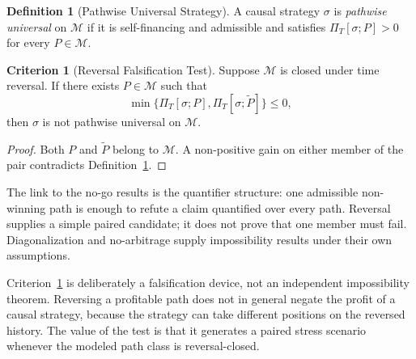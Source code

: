 \documentclass[aps,pra,reprint,superscriptaddress,amsmath,amssymb,floatfix]{revtex4-2}
\theoremstyle{plain}
\theoremstyle{definition}
\newtheorem{definition}{Definition}
\newtheorem{criterion}{Criterion}
\theoremstyle{remark}
\begin{document}
\begin{definition}[Pathwise Universal Strategy]
\label{def:universal}
  A causal strategy \(\sigma\) is \emph{pathwise universal} on
  \(\mathcal{M}\) if it is self-financing and admissible and satisfies
  \(\Pi_T[\sigma;P]>0\) for every \(P\in\mathcal{M}\).
\end{definition}

\begin{criterion}[Reversal Falsification Test]
  \label{crit:tr}
  Suppose \(\mathcal{M}\) is closed under time reversal. If there exists
  \(P\in\mathcal{M}\) such that
  \begin{equation}
    \min\{\Pi_T[\sigma;P],\Pi_T[\sigma;\widetilde P]\}\leq 0,
    \label{eq:reversaltest}
  \end{equation}
  then \(\sigma\) is not pathwise universal on \(\mathcal{M}\).
\end{criterion}

\begin{proof}
Both \(P\) and \(\widetilde P\) belong to \(\mathcal{M}\). A non-positive gain
on either member of the pair contradicts Definition~\ref{def:universal}.
\end{proof}

The link to the no-go results is the quantifier structure: one admissible
non-winning path is enough to refute a claim quantified over every path.
Reversal supplies a simple paired candidate; it does not prove that one member
must fail. Diagonalization and no-arbitrage supply impossibility results under
their own assumptions.

Criterion~\ref{crit:tr} is deliberately a falsification device, not an
independent impossibility theorem. Reversing a profitable path does not in
general negate the profit of a causal strategy, because the strategy can take
different positions on the reversed history. The value of the test is that it
generates a paired stress scenario whenever the modeled path class is
reversal-closed.
\end{document}

